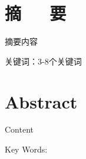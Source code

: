 \chapter*{摘~~~要}

摘要内容

\vspace{1.95\ccwd}

关键词：3-8个关键词 

\chapter*{\textbf{Abstract}}

Content

\vspace{1.95\ccwd}

Key Words: 
